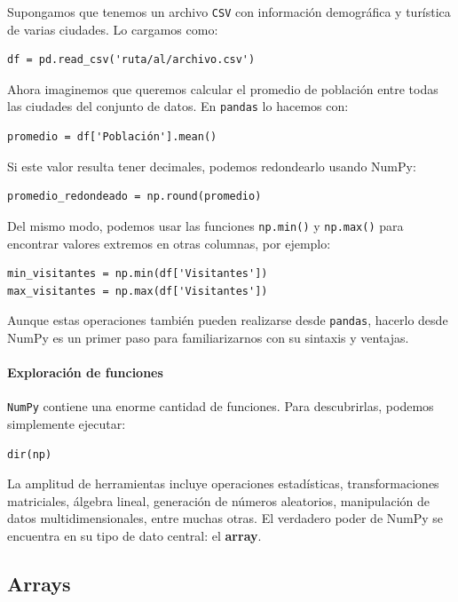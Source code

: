 \documentclass{article}
\theoremstyle{nonumberplain}
\begin{document}
Supongamos que tenemos un archivo \texttt{CSV} con información demográfica y turística de varias ciudades. Lo cargamos como:

\begin{verbatim}
df = pd.read_csv('ruta/al/archivo.csv')
\end{verbatim}

Ahora imaginemos que queremos calcular el promedio de población entre todas las ciudades del conjunto de datos. En \texttt{pandas} lo hacemos con:

\begin{verbatim}
promedio = df['Población'].mean()
\end{verbatim}

Si este valor resulta tener decimales, podemos redondearlo usando NumPy:

\begin{verbatim}
promedio_redondeado = np.round(promedio)
\end{verbatim}

Del mismo modo, podemos usar las funciones \texttt{np.min()} y \texttt{np.max()} para encontrar valores extremos en otras columnas, por ejemplo:

\begin{verbatim}
min_visitantes = np.min(df['Visitantes'])
max_visitantes = np.max(df['Visitantes'])
\end{verbatim}

Aunque estas operaciones también pueden realizarse desde \texttt{pandas}, hacerlo desde NumPy es un primer paso para familiarizarnos con su sintaxis y ventajas.

\paragraph{Exploración de funciones}

\texttt{NumPy} contiene una enorme cantidad de funciones. Para descubrirlas, podemos simplemente ejecutar:

\begin{verbatim}
dir(np)
\end{verbatim}

La amplitud de herramientas incluye operaciones estadísticas, transformaciones matriciales, álgebra lineal, generación de números aleatorios, manipulación de datos multidimensionales, entre muchas otras. El verdadero poder de NumPy se encuentra en su tipo de dato central: el \textbf{array}.

\subsection*{Arrays}
\end{document}
